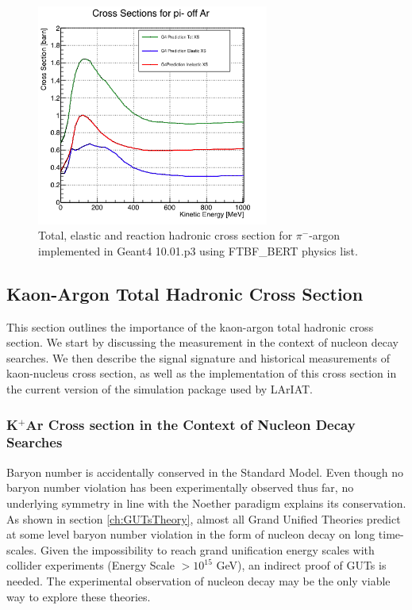 \begin{figure}[hbpt]
\centering
\includegraphics[width=3in]{Chapter-1/Images/cPionsG4.png}
\caption{Total, elastic and reaction hadronic cross section for $\pi^-$-argon implemented in Geant4  10.01.p3 using FTBF\_BERT physics list.}
\label{fig:PionTrueArgon}
\end{figure}

\clearpage


\subsection{Kaon-Argon Total Hadronic Cross Section}
This section outlines the importance of the kaon-argon total hadronic cross section. We start by discussing the measurement in the context of nucleon decay searches. %
 We then describe the signal signature and historical measurements of kaon-nucleus cross section, as well as the implementation of this cross section in the current version of the simulation package used by LArIAT.

\subsubsection{K$^{+}$Ar Cross section in the Context of Nucleon Decay Searches}\label{sec:theoryPDK}
Baryon number is accidentally conserved in the Standard Model. Even though no baryon number violation has been experimentally observed thus far, no underlying symmetry in line with the Noether paradigm \cite{Noether1971} explains its conservation. As shown in section \ref{ch:GUTsTheory}, almost all Grand Unified Theories predict at some level baryon number violation in the form of nucleon decay on long time-scales.  Given the impossibility to reach grand unification energy scales with collider experiments (Energy Scale $> 10^{15}$ GeV),  an indirect proof of GUTs is needed. The experimental observation of nucleon decay may be the only viable way to explore these theories. 

